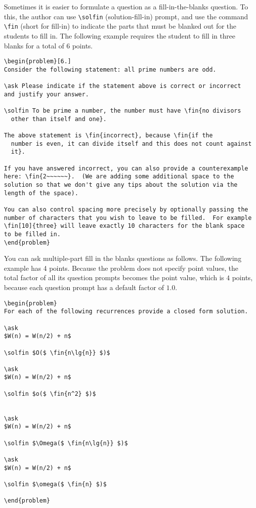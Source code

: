 \begin{example}
Sometimes it is easier to formulate a question as a fill-in-the-blanks
question.  To this, the author can use \lstinline`\solfin`
(solution-fill-in) prompt, and
%
use the command \lstinline`\fin` (short for fill-in) to indicate the
parts that must be blanked  out for  the students to fill in.
%
The following example requires the student
to fill in three blanks for a total of $6$ points.

\begin{lstlisting}
\begin{problem}[6.]
Consider the following statement: all prime numbers are odd.

\ask Please indicate if the statement above is correct or incorrect
and justify your answer.

\solfin To be prime a number, the number must have \fin{no divisors
  other than itself and one}.

The above statement is \fin{incorrect}, because \fin{if the
  number is even, it can divide itself and this does not count against
  it}.

If you have answered incorrect, you can also provide a counterexample
here: \fin{2~~~~~~}.  (We are adding some additional space to the
solution so that we don't give any tips about the solution via the
length of the space).

You can also control spacing more precisely by optionally passing the number of characters that you wish to leave to be filled.  For example \fin[10]{three} will leave exactly 10 characters for the blank space to be filled in.
\end{problem}
\end{lstlisting}
\end{example}



\begin{example}
You can ask multiple-part fill in the blanks questions as follows.
The following example has 4 points.  Because the problem does not specify point values, the total factor of all its question prompts becomes the point value, which is $4$ points, because each question prompt has a default factor of $1.0$.

\begin{lstlisting}
\begin{problem}
For each of the following recurrences provide a closed form solution.

\ask 
$W(n) = W(n/2) + n$

\solfin $O($ \fin{n\lg{n}} $)$

\ask 
$W(n) = W(n/2) + n$

\solfin $o($ \fin{n^2} $)$


\ask 
$W(n) = W(n/2) + n$

\solfin $\Omega($ \fin{n\lg{n}} $)$

\ask 
$W(n) = W(n/2) + n$

\solfin $\omega($ \fin{n} $)$

\end{problem}
\end{lstlisting}
\end{example}


